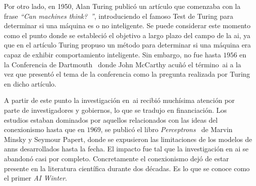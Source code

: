 Por otro lado, en 1950, Alan Turing publicó un artículo que comenzaba con la frase \textit{\enquote{Can machines think?~\cite{turing1950computing}}}, introduciendo el famoso Test de Turing para determinar si una máquina es o no inteligente. Se puede considerar este momento como el punto donde se estableció el objetivo a largo plazo del campo de la \ac{ai}, ya que en el artículo Turing propuso un método para determinar si una máquina era capaz de exhibir comportamiento inteligente. Sin embargo, no fue hasta $1956$ en la Conferencia de Dartmouth~\cite{mccarthy1956dartmouth} donde John McCarthy acuñó el término~\ac{ai} a la vez que presentó el tema de la conferencia como la pregunta realizada por Turing en dicho artículo.

A partir de este punto la investigación en~\ac{ai} recibió muchísima atención por parte de investigadores y gobiernos, lo que se tradujo en financiación. Los estudios estaban dominados por aquellos relacionados con las ideas del conexionismo hasta que en $1969$, se publicó el libro \textit{Perceptrons}~\cite{minsky1969perceptrons} de Marvin Minsky y Seymour Papert, donde se expusieron las limitaciones de los modelos de \acp{ann} desarrollados hasta la fecha. El impacto fue tal que la investigación en \gls{ai} se abandonó casi por completo. Concretamente el conexionismo dejó de estar presente en la literatura científica durante dos décadas. Es lo que se conoce como el primer \textit{AI Winter}.

